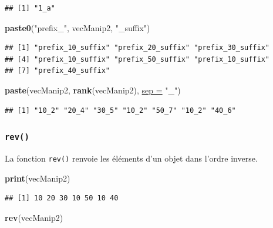 \documentclass[twoside,symmetric]{book}
\newenvironment{Shaded}{}{}
\newcommand{\DataTypeTok}[1]{\underline{#1}}
\newcommand{\KeywordTok}[1]{\textbf{#1}}
\newcommand{\NormalTok}[1]{#1}
\newcommand{\StringTok}[1]{#1}
\begin{document}
\begin{verbatim}
## [1] "1_a"
\end{verbatim}

\begin{Shaded}
\begin{Highlighting}[]
\KeywordTok{paste0}\NormalTok{(}\StringTok{"prefix_"}\NormalTok{, vecManip2, }\StringTok{"_suffix"}\NormalTok{)}
\end{Highlighting}
\end{Shaded}

\begin{verbatim}
## [1] "prefix_10_suffix" "prefix_20_suffix" "prefix_30_suffix"
## [4] "prefix_10_suffix" "prefix_50_suffix" "prefix_10_suffix"
## [7] "prefix_40_suffix"
\end{verbatim}

\begin{Shaded}
\begin{Highlighting}[]
\KeywordTok{paste}\NormalTok{(vecManip2, }\KeywordTok{rank}\NormalTok{(vecManip2), }\DataTypeTok{sep =} \StringTok{"_"}\NormalTok{)}
\end{Highlighting}
\end{Shaded}

\begin{verbatim}
## [1] "10_2" "20_4" "30_5" "10_2" "50_7" "10_2" "40_6"
\end{verbatim}

\hypertarget{l015rev}{%
\subsubsection{\texorpdfstring{\texttt{rev()}}{rev()}}\label{l015rev}}

La fonction \texttt{rev()} renvoie les éléments d'un objet dans l'ordre inverse.

\begin{Shaded}
\begin{Highlighting}[]
\KeywordTok{print}\NormalTok{(vecManip2)}
\end{Highlighting}
\end{Shaded}

\begin{verbatim}
## [1] 10 20 30 10 50 10 40
\end{verbatim}

\begin{Shaded}
\begin{Highlighting}[]
\KeywordTok{rev}\NormalTok{(vecManip2)}
\end{Highlighting}
\end{Shaded}
\end{document}
